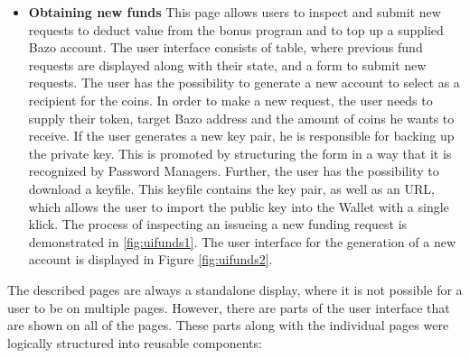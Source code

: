 \begin{itemize}
\item \textbf{Obtaining new funds}
This page allows users to inspect and submit new requests to deduct value from the bonus program and to top up a supplied Bazo account.
The user interface consists of table, where previous fund requests are displayed along with their state, and a form to submit new requests. The user has the possibility to generate a new account to select as a recipient for the coins. In order to make a new request, the user needs to supply their token, target Bazo address and the amount of coins he wants to receive. If the user generates a new key pair, he is responsible for backing up the private key. This is promoted by structuring the form in a way that it is recognized by Password Managers. Further, the user has the possibility to download a keyfile. This keyfile contains the key pair, as well as an URL, which allows the user to import the public key into the Wallet with a single klick. The process of inspecting an issueing a new funding request is demonstrated in \ref{fig:uifunds1}. The user interface for the generation of a new account is displayed in Figure \ref{fig:uifunds2}.
\end{itemize}
The described pages are always a standalone display, where it is not possible for a user to be on multiple pages. However, there are parts of the user interface that are shown on all of the pages. These parts along with the individual pages were logically structured into reusable components:
